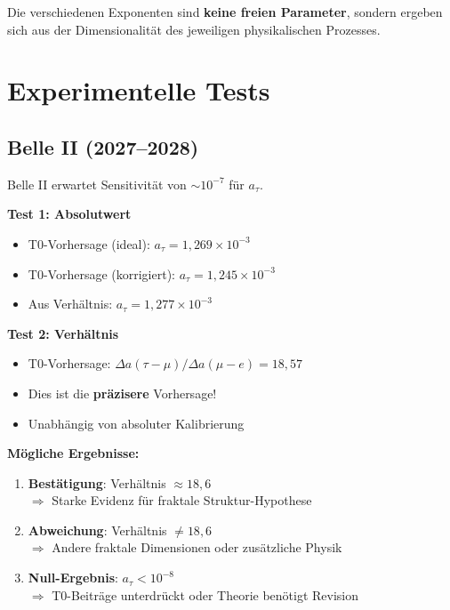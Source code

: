 	Die verschiedenen Exponenten sind \textbf{keine freien Parameter}, sondern ergeben sich aus der Dimensionalität des jeweiligen physikalischen Prozesses.
	
	\section{Experimentelle Tests}
	
	\subsection{Belle II (2027--2028)}
	
	Belle II erwartet Sensitivität von $\sim 10^{-7}$ für $a_\tau$.
	
	\textbf{Test 1: Absolutwert}
	\begin{itemize}
		\item T0-Vorhersage (ideal): $a_\tau = 1{,}269 \times 10^{-3}$
		\item T0-Vorhersage (korrigiert): $a_\tau = 1{,}245 \times 10^{-3}$
		\item Aus Verhältnis: $a_\tau = 1{,}277 \times 10^{-3}$
	\end{itemize}
	
	\textbf{Test 2: Verhältnis}
	\begin{itemize}
		\item T0-Vorhersage: $\Delta a(\tau - \mu) / \Delta a(\mu - e) = 18{,}57$
		\item Dies ist die \textbf{präzisere} Vorhersage!
		\item Unabhängig von absoluter Kalibrierung
	\end{itemize}
	
	\textbf{Mögliche Ergebnisse:}
	\begin{enumerate}
		\item \textbf{Bestätigung}: Verhältnis $\approx 18{,}6$ \\
		$\Rightarrow$ Starke Evidenz für fraktale Struktur-Hypothese
		
		\item \textbf{Abweichung}: Verhältnis $\neq 18{,}6$ \\
		$\Rightarrow$ Andere fraktale Dimensionen oder zusätzliche Physik
		
		\item \textbf{Null-Ergebnis}: $a_\tau < 10^{-8}$ \\
		$\Rightarrow$ T0-Beiträge unterdrückt oder Theorie benötigt Revision
	\end{enumerate}
	

